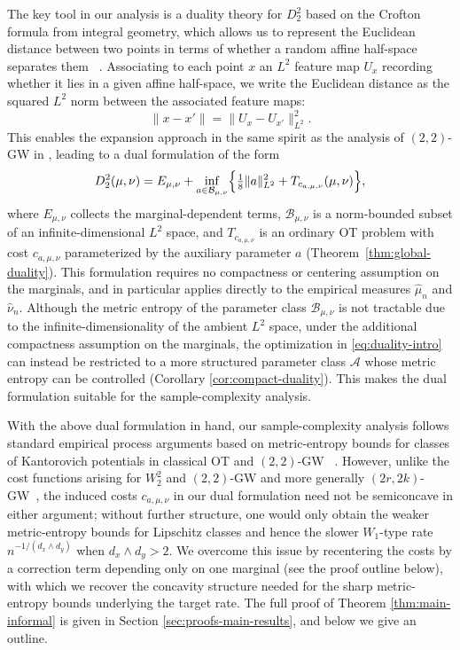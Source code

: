 \documentclass[11pt]{amsart}
\theoremstyle{definition}
\theoremstyle{remark}
\newcommand{\1}{\mathbf{1}}
\numberwithin{equation}{section}
\begin{document}
The key tool in our analysis is a duality theory for $D_{2}^2$ based on
the Crofton formula from integral geometry, which allows us to represent the
Euclidean distance between two points in terms of whether a random affine half-space separates them ~\cite{Santalo2004}. Associating to each point $x$ an $L^2$ feature map $U_x$ recording whether it lies in a given affine half-space, we
write the Euclidean distance as the squared $L^2$ norm between the associated
feature maps:
\[\|x-x'\| = \|U_x - U_{x'}\|^2_{L^2}.\]
This enables the expansion approach in the same spirit as the analysis of $(2,2)$-GW in \cite{zhang2024gromov}, leading to a dual formulation of the form
\begin{equation}\label{eq:duality-intro}
D_{2}^2(\mu,\nu)
= E_{\mu,\nu}
+ \inf_{a \in \mathcal B_{\mu,\nu}}
\Bigl\{ \tfrac{1}{8}\|a\|_{L^2}^2 + T_{c_{a,\mu,\nu}}(\mu,\nu) \Bigr\},
\end{equation}
where $E_{\mu,\nu}$ collects the marginal-dependent terms,
$\mathcal B_{\mu,\nu}$ is a norm-bounded subset of an infinite-dimensional $L^2$
space, and $T_{c_{a,\mu,\nu}}$ is an ordinary OT problem with cost
$c_{a,\mu,\nu}$ parameterized by the auxiliary parameter $a$
(Theorem~\ref{thm:global-duality}). This formulation requires no 
compactness or centering assumption on the marginals, and in particular applies directly
to the empirical measures $\widehat\mu_n$ and $\widehat\nu_n$. Although the metric entropy of the parameter class $\mathcal B_{\mu,\nu}$ is not tractable due to the infinite-dimensionality of the ambient $L^2$ space, under the additional compactness assumption on the marginals, the optimization in \eqref{eq:duality-intro} can instead be restricted to a more structured parameter class $\mathcal A$ whose metric entropy can be controlled (Corollary \ref{cor:compact-duality}). This makes the dual formulation suitable for the sample-complexity analysis.


With the above dual formulation in hand, our sample-complexity analysis
follows standard empirical process arguments based on metric-entropy bounds for classes of
Kantorovich potentials in classical OT and
$(2,2)$-GW ~\cite{manole2024sharp,zhang2024gromov}. However, unlike the
cost functions arising for $W_2^2$ and $(2,2)$-GW and more generally $(2r,2k)$-GW~\cite{paliy2026empirical}, the induced costs
$c_{a,\mu,\nu}$ in our dual formulation need not be semiconcave in either argument; without further structure, one would only obtain the weaker metric-entropy bounds for Lipschitz classes and hence the slower $W_1$-type rate $n^{-1/(d_x\wedge d_y)}$ when $d_x\wedge d_y>2$. We overcome this issue by recentering the costs by a correction term depending only on one marginal (see the proof outline below), with which we recover the concavity structure needed for the sharp metric-entropy bounds underlying the target rate. The full proof of Theorem \ref{thm:main-informal} is given in Section \ref{sec:proofs-main-results}, and below we give an outline.
\end{document}
